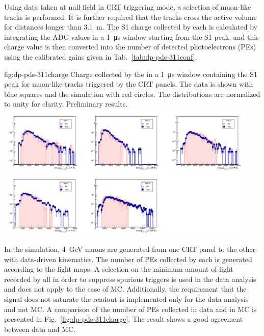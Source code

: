 Using data taken at null field in CRT triggering mode, a selection of muon-like tracks is performed. It is further required that the tracks cross the active volume for distances longer than \SI{3.1}{\m}. 
The S1 charge collected by each  is calculated by integrating the ADC values in a \SI{1}{\us} window starting from the S1 peak, and this charge value is then converted into the number of detected photoelectrons (PEs) using the calibrated  gains given in Tab.~\ref{tab:dp-pds-311conf}.

\begin{dunefigure}{fig:dp-pds-311charge}{ Charge collected by the  in a \SI{1}{\us} window containing the S1 peak for muon-like tracks triggered by the CRT panels. The data is shown with blue squares and the simulation with red circles. The distributions are normalized to unity for clarity. Preliminary results.}
\includegraphics[width=0.95\textwidth]{graphics/dppd_7_3.png}
\end{dunefigure}

In the simulation, \SI{4}{\GeV} muons are generated from one CRT panel to the other with data-driven kinematics. The number of PEs collected by each  is generated according to the light maps. A selection on the minimum amount of light recorded by all  in order to suppress spurious triggers is used in the data analysis and does not apply to the case of MC. Additionally, the requirement that the  signal does not saturate the readout is implemented only for the data analysis and not MC. A comparison of the number of PEs collected in data and in MC is presented in Fig.~\ref{fig:dp-pds-311charge}. The result shows a good agreement between data and MC.


